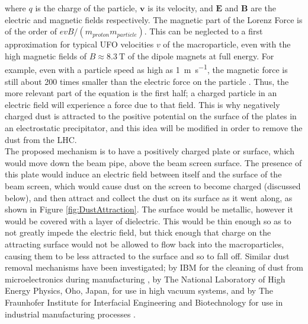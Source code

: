 \documentclass[../main.tex]{subfiles}
\begin{document}
where $q$ is the charge of the particle, $\textbf{v}$ is its velocity, and $\textbf{E}$ and $\textbf{B}$ are the electric and magnetic fields respectively.
The magnetic part of the Lorenz Force is of the order of $evB/(m_{proton}m_{particle})$.
This can be neglected to a first approximation for typical UFO velocities $v$ of the macroparticle, even with the high magnetic fields of $B \approx \SI{8.3}{\tesla}$ of the dipole magnets at full energy.
For example, even with a particle speed as high as \SI{1}{\metre\per\second}, the magnetic force is still about 200 times smaller than the electric force on the particle \cite{zimmermann}.
Thus, the  more relevant part of the equation is the first half; a charged particle in an electric field will experience a force due to that field.
This is why negatively charged dust is attracted to the positive potential on the surface of the plates in an electrostatic precipitator, and this idea will be modified in order to remove the dust from the LHC.\\

The proposed mechanism is to have a positively charged plate or surface, which would move down the beam pipe, above the beam screen surface.
The presence of this plate would induce an electric field between itself and the surface of the beam screen, which would cause dust on the screen to become charged (discussed below), and then attract and collect the dust on its surface as it went along, as shown in Figure \ref{fig:DustAttraction}.
The surface would be metallic, however it would be covered with a layer of dielectric.
This would be thin enough so as to not greatly impede the electric field, but thick enough that charge on the attracting surface would not be allowed to flow back into the macroparticles, causing them to be less attracted to the surface and so to fall off.
Similar dust removal mechanisms have been investigated; by IBM for the cleaning of dust from microelectronics during manufacturing \cite{cooper_essc}, by The National Laboratory of High Energy Physics, Oho, Japan, for use in high vacuum systems\cite{saeki_essc}, and by The Fraunhofer Institute for Interfacial Engineering and Biotechnology for use in industrial manufacturing processes \cite{fraunhofer_essc}.
\end{document}
